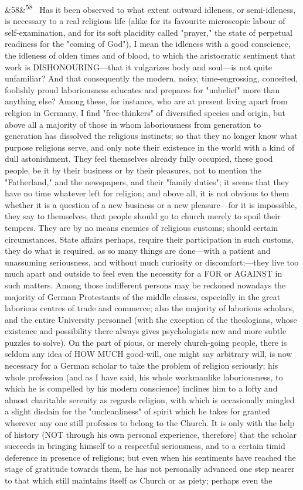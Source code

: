 \documentclass[12pt]{article}
\newcommand{\para}[1][]{\par\noindent\ifx&#1&\else\textsuperscript{\footnotesize #1}~\fi}
\begin{document}
\para[58] Has it been observed to what extent outward idleness, or semi-idleness, is necessary to a real religious life (alike for its favourite microscopic labour of self-examination, and for its soft placidity called "prayer," the state of perpetual readiness for the "coming of God"), I mean the idleness with a good conscience, the idleness of olden times and of blood, to which the aristocratic sentiment that work is DISHONOURING---that it vulgarizes body and soul---is not quite unfamiliar? And that consequently the modern, noisy, time-engrossing, conceited, foolishly proud laboriousness educates and prepares for "unbelief" more than anything else? Among these, for instance, who are at present living apart from religion in Germany, I find "free-thinkers" of diversified species and origin, but above all a majority of those in whom laboriousness from generation to generation has dissolved the religious instincts; so that they no longer know what purpose religions serve, and only note their existence in the world with a kind of dull astonishment. They feel themselves already fully occupied, these good people, be it by their business or by their pleasures, not to mention the "Fatherland," and the newspapers, and their "family duties"; it seems that they have no time whatever left for religion; and above all, it is not obvious to them whether it is a question of a new business or a new pleasure---for it is impossible, they say to themselves, that people should go to church merely to spoil their tempers. They are by no means enemies of religious customs; should certain circumstances, State affairs perhaps, require their participation in such customs, they do what is required, as so many things are done---with a patient and unassuming seriousness, and without much curiosity or discomfort;---they live too much apart and outside to feel even the necessity for a FOR or AGAINST in such matters. Among those indifferent persons may be reckoned nowadays the majority of German Protestants of the middle classes, especially in the great laborious centres of trade and commerce; also the majority of laborious scholars, and the entire University personnel (with the exception of the theologians, whose existence and possibility there always gives psychologists new and more subtle puzzles to solve). On the part of pious, or merely church-going people, there is seldom any idea of HOW MUCH good-will, one might say arbitrary will, is now necessary for a German scholar to take the problem of religion seriously; his whole profession (and as I have said, his whole workmanlike laboriousness, to which he is compelled by his modern conscience) inclines him to a lofty and almost charitable serenity as regards religion, with which is occasionally mingled a slight disdain for the "uncleanliness" of spirit which he takes for granted wherever any one still professes to belong to the Church. It is only with the help of history (NOT through his own personal experience, therefore) that the scholar succeeds in bringing himself to a respectful seriousness, and to a certain timid deference in presence of religions; but even when his sentiments have reached the stage of gratitude towards them, he has not personally advanced one step nearer to that which still maintains itself as Church or as piety; perhaps even the 
\end{document}
